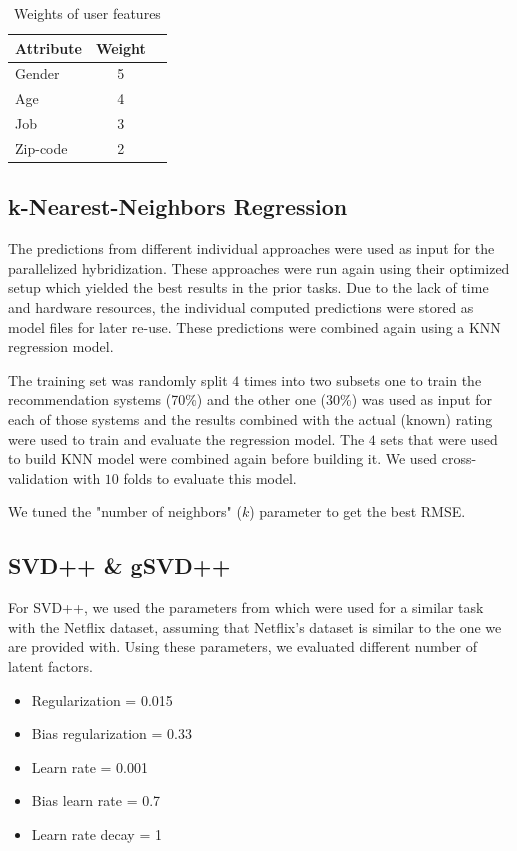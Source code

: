\documentclass{sigish}
\begin{document}
\begin{table}[]
	\centering
	\begin{tabular}{|l|c|c|}
		\hline
		\textbf{Attribute} & \textbf{Weight} \\ \hline
		Gender             & 5               \\ \hline
		Age             & 4               \\ \hline
		Job             & 3               \\ \hline
		Zip-code             & 2               \\ \hline
	\end{tabular}
	\caption{Weights of user features}
	\label{tab:user_weights}
\end{table}

\subsection{k-Nearest-Neighbors Regression}
The predictions from different individual approaches were used as input for the parallelized hybridization. These approaches were run again using their optimized setup which yielded the best results in the prior tasks. Due to the lack of time and hardware resources, the individual computed predictions were stored as model files for later re-use. These predictions were combined again using a KNN regression model.

The training set was randomly split $ 4 $ times into two subsets one to train the recommendation systems (70\%) and the other one (30\%) was used as input for each of those systems and the results combined with the actual (known) rating were used to train and evaluate the regression model.
The $ 4 $ sets that were used to build KNN model were combined again before building it. We used cross-validation with $ 10 $ folds to evaluate this model.

We tuned the "number of neighbors" ($ k $) parameter to get the best RMSE. 

\subsection{SVD++ \& gSVD++}
For SVD++, we used the parameters from \cite{Koren:2009} which were used for a similar task with the Netflix dataset, assuming that Netflix's dataset is similar to the one we are provided with. Using these parameters, we evaluated different number of latent factors.
\begin{itemize}
\item Regularization = 0.015
\item Bias regularization = 0.33
\item Learn rate = 0.001
\item Bias learn rate = 0.7
\item Learn rate decay = 1
\end{itemize}
\end{document}

